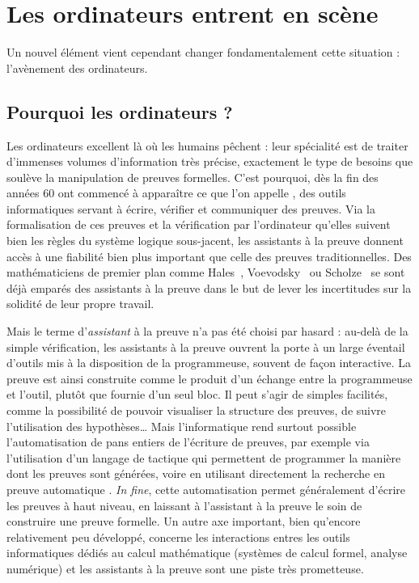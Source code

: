 \section{Les ordinateurs entrent en scène}
\label{sec:assistants-preuve}

Un nouvel élément vient cependant changer fondamentalement cette situation :
l’avènement des ordinateurs.

\subsection{Pourquoi les ordinateurs ?}

Les ordinateurs excellent là où les humains pêchent : leur spécialité est de traiter
d’immenses volumes d’information très précise, exactement le type
de besoins que soulève la manipulation de preuves formelles. C’est pourquoi, dès
la fin des années 60
ont commencé à apparaître ce que l’on appelle , des outils informatiques servant à écrire, vérifier et communiquer des
preuves.
Via la formalisation de ces preuves et la vérification par l’ordinateur qu’elles
suivent bien les règles du système logique sous-jacent, les assistants à la preuve
donnent accès à une fiabilité bien plus important que celle des preuves
traditionnelles. Des mathématiciens de premier plan comme
Hales~,
Voevodsky~\cite{??} ou
Scholze~\cite{LiquidTensorExperiment}
se sont déjà emparés des assistants à la preuve dans le but de lever les incertitudes
sur la solidité de leur propre travail.

Mais le terme d’\emph{assistant} à la preuve n’a pas été choisi par hasard : au-delà
de la simple vérification, les assistants à la preuve ouvrent la porte à un large
éventail d’outils mis à la disposition de la programmeuse, souvent de façon
interactive. La preuve est ainsi construite comme le produit d’un échange entre 
la programmeuse et l’outil, plutôt que fournie d’un seul bloc.
Il peut s’agir de simples
facilités, comme la possibilité de pouvoir visualiser la structure des
preuves, de suivre l’utilisation des hypothèses…
Mais l’informatique rend surtout possible l’automatisation de pans entiers
de l’écriture de preuves,
par exemple via l’utilisation d’un langage de tactique \cite{??} qui permettent
de programmer la manière dont les preuves sont
générées, voire en utilisant directement la recherche en preuve automatique
\cite{Sledgehammer,SMTCoq}.
\textit{In fine}, cette automatisation permet généralement d’écrire
les preuves à haut niveau, en laissant à l’assistant à la preuve le soin
de construire une preuve formelle.
Un autre axe important, bien qu’encore relativement peu développé, concerne
les interactions entres les outils informatiques dédiés au calcul mathématique
(systèmes de calcul formel, analyse numérique) et les assistants à la
preuve sont une piste très prometteuse.

